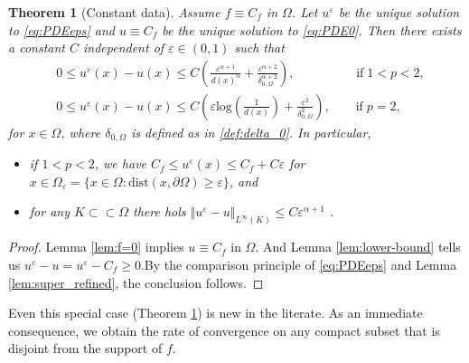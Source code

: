 \documentclass[12pt,reqno]{amsart}
\numberwithin{figure}{section}
\theoremstyle{plain}
\newtheorem{thm}{Theorem}[section]
\theoremstyle{remark}
\numberwithin{equation}{section}
\begin{document}
\begin{thm}[Constant data]\label{thm:rate_doubling0} Assume $f\equiv C_f$ in $\Omega$. Let $u^\varepsilon$ be the unique solution to \eqref{eq:PDEeps} and $u \equiv C_f$ be the unique solution to \eqref{eq:PDE0}. Then there exists a constant $C$ independent of $\varepsilon\in(0,1)$ such that 
    \begin{equation*}
    \begin{split}
    &0\leq u^\varepsilon(x) - u(x)\leq C \left(\frac{ \varepsilon^{\alpha+1}}{d(x)^\alpha} + \frac{\varepsilon^{\alpha+2}}{\delta_{0,\Omega}^{\alpha+2}}\right),  \qquad\qquad \;\;\; \text{if}\; 1<p<2,\\
    &0\leq u^\varepsilon(x) - u(x)\leq C \left(\varepsilon \mathrm{log}\left(\frac{1}{d(x)}\right) + \frac{\varepsilon^{2}}{\delta_{0,\Omega}^{2}}\right),  \qquad \text{if}\; p=2,
    \end{split}
\end{equation*}
for $x\in \Omega$, where $\delta_{0,\Omega}$ is defined as in \eqref{def:delta_0}. In particular, 
\begin{itemize}
    \item[(i)] if $1<p<2$, we have $C_f\leq u^\varepsilon(x)\leq C_f + C\varepsilon$ for $x\in \Omega_\varepsilon = \{x\in \Omega: \mathrm{dist}(x,\partial\Omega) \geq \varepsilon\}$, and
    \item[(ii)] for any $K\subset\subset \Omega$ there hols $\Vert u^\varepsilon - u\Vert_{L^\infty(K)} \leq C\varepsilon^{\alpha+1}$ .
\end{itemize}
\end{thm}

\begin{proof} Lemma \ref{lem:f=0} implies $u \equiv C_f$ in $\Omega$. And Lemma \ref{lem:lower-bound} tells us $u^\varepsilon-u=u^\varepsilon-C_f \geq 0$.By the comparison principle of \eqref{eq:PDEeps} and Lemma \ref{lem:super_refined}, the conclusion follows.
\end{proof}
Even this special case (Theorem \ref{thm:rate_doubling0}) is new in the literate. As an immediate consequence, we obtain the rate of convergence on any compact subset that is disjoint from the support of $f$.
\end{document}
